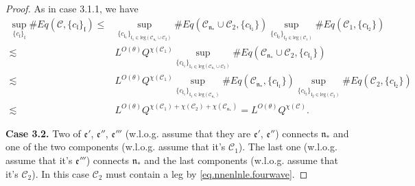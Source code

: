 \begin{proof}
    As in case 3.1.1, we have
    \begin{equation}
    \begin{split}
     \sup_{\{c_{\mathfrak{l}}\}_{\mathfrak{l}}}\#Eq(\mathcal{C},\{c_{\mathfrak{l}}\}_{\mathfrak{l}})
     \le&
     \sup_{\{c_{\mathfrak{l}_1}\}_{\mathfrak{l}_1\in \text{leg}(\mathcal{C}_{\mathfrak{n}_*}\cup \mathcal{C}_2)} } \# Eq(\mathcal{C}_{\mathfrak{n}_*}\cup \mathcal{C}_2,\{c_{\mathfrak{l}_1}\}) \sup_{\{c_{\mathfrak{l}_2}\}_{\mathfrak{l}_2\in \text{leg}(\mathcal{C}_1)} }\# Eq(\mathcal{C}_{1}, \{c_{\mathfrak{l}_2}\})
     \\
     \lesssim& L^{O(\theta)} Q^{\chi(\mathcal{C}_1)}\sup_{\{c_{\mathfrak{l}_1}\}_{\mathfrak{l}_1\in \text{leg}(\mathcal{C}_{\mathfrak{n}_*}\cup \mathcal{C}_2)} } \# Eq(\mathcal{C}_{\mathfrak{n}_*}\cup \mathcal{C}_2,\{c_{\mathfrak{l}_1}\})
     \\
     \lesssim& L^{O(\theta)} Q^{\chi(\mathcal{C}_1)} \sup_{\{c_{\mathfrak{l}_1}\}_{\mathfrak{l}_1\in \text{leg}(\mathcal{C}_{\mathfrak{n}_*})} } \# Eq(\mathcal{C}_{\mathfrak{n}_*},\{c_{\mathfrak{l}_1}\}) \sup_{\{c_{\mathfrak{l}_2}\}_{\mathfrak{l}_2\in \text{leg}(\mathcal{C}_2)} }\# Eq(\mathcal{C}_{2}, \{c_{\mathfrak{l}_2}\})
     \\
     \lesssim& L^{O(\theta)} Q^{\chi(\mathcal{C}_1)+\chi(\mathcal{C}_2)+\chi(\mathcal{C}_{\mathfrak{n}_*})}=L^{O(\theta)} Q^{\chi(\mathcal{C})}.
    \end{split}
    \end{equation}
    
    \textbf{Case 3.2.} Two of $\mathfrak{e}'$, $\mathfrak{e}''$, $\mathfrak{e}'''$ (w.l.o.g. assume that they are $\mathfrak{e}'$, $\mathfrak{e}''$) connects $\mathfrak{n}_*$ and one of the two components (w.l.o.g. assume that it's $\mathcal{C}_1$). The last one (w.l.o.g. assume that it's $\mathfrak{e}'''$) connects $\mathfrak{n}_*$ and the last components (w.l.o.g. assume that it's $\mathcal{C}_2$). In this case $\mathcal{C}_2$ must contain a leg by \eqref{eq.nnenlnle.fourwave}.
    

\end{proof}
